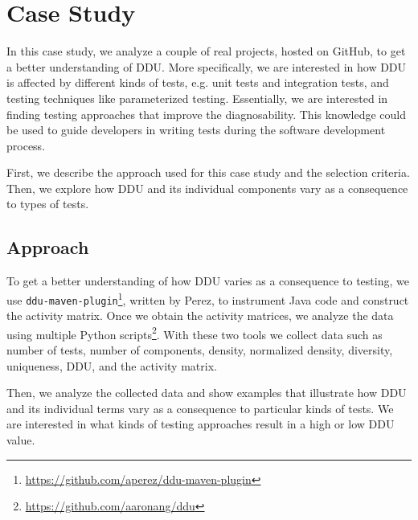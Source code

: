 \chapter{Case Study}
\label{ch:case_study}

In this case study, we analyze a couple of real projects, hosted on GitHub, to get a better understanding of DDU.
More specifically, we are interested in how DDU is affected by different kinds of tests, e.g. unit tests and integration tests, and testing techniques like parameterized testing.
Essentially, we are interested in finding testing approaches that improve the diagnosability.
This knowledge could be used to guide developers in writing tests during the software development process.

First, we describe the approach used for this case study and the selection criteria. Then, we explore how DDU and its individual components vary as a consequence to types of tests. 


\section{Approach}

To get a better understanding of how DDU varies as a consequence to testing, we use \texttt{ddu-maven-plugin}\footnote{\url{https://github.com/aperez/ddu-maven-plugin}}, written by Perez, to instrument Java code and construct the activity matrix.
Once we obtain the activity matrices, we analyze the data using multiple Python scripts\footnote{\url{https://github.com/aaronang/ddu}}.
With these two tools we collect data such as number of tests, number of components, density, normalized density, diversity, uniqueness, DDU, and the activity matrix.

Then, we analyze the collected data and show examples that illustrate how DDU and its individual terms vary as a consequence to particular kinds of tests.
We are interested in what kinds of testing approaches result in a high or low DDU value.


